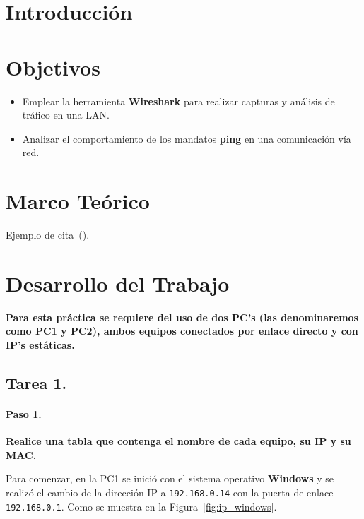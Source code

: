 \setcounter{page}{1}

\section{Introducción}
\section{Objetivos}
    \begin{itemize}
        \item Emplear la herramienta \textbf{Wireshark} para realizar capturas y análisis de tráfico en una LAN.
        \item Analizar el comportamiento de los mandatos \textbf{ping} en una comunicación vía red.
    \end{itemize}
\section{Marco Teórico}
    Ejemplo de cita~(\cite{buffett84}).

\newpage
\section{Desarrollo del Trabajo}
    \textbf{Para esta práctica se requiere del uso de dos PC's (las denominaremos como PC1 y PC2), ambos equipos conectados por enlace directo y con IP's estáticas.}

    \subsection{Tarea 1.}
        \paragraph{Paso 1.}
        \textbf{Realice una tabla que contenga el nombre de cada equipo, su IP y su MAC.}

        Para comenzar, en la PC1 se inició con el sistema operativo \textbf{Windows} y se realizó el cambio de la dirección IP a \texttt{192.168.0.14} con la puerta de enlace \texttt{192.168.0.1}. Como se muestra en la Figura~\ref{fig:ip_windows}.

